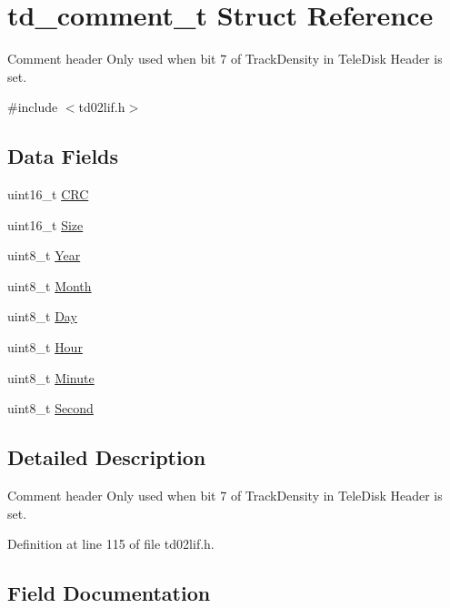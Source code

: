 \hypertarget{structtd__comment__t}{}\section{td\+\_\+comment\+\_\+t Struct Reference}
\label{structtd__comment__t}


Comment header Only used when bit 7 of Track\+Density in Tele\+Disk Header is set.  




{\ttfamily \#include $<$td02lif.\+h$>$}

\subsection*{Data Fields}
\begin{DoxyCompactItemize}
\item 
uint16\+\_\+t \hyperlink{structtd__comment__t_a4bcc6435d5a4408627be9f50ef124211}{C\+RC}
\item 
uint16\+\_\+t \hyperlink{structtd__comment__t_aca61f38ae62a6de2ff0eab7da2c25e11}{Size}
\item 
uint8\+\_\+t \hyperlink{structtd__comment__t_a0c804ec07303f411dd508dc64900aff5}{Year}
\item 
uint8\+\_\+t \hyperlink{structtd__comment__t_ac926fbfad0e3544bb45bb05b7cd66c49}{Month}
\item 
uint8\+\_\+t \hyperlink{structtd__comment__t_ab42475ed36aa4475f76336099fd53acc}{Day}
\item 
uint8\+\_\+t \hyperlink{structtd__comment__t_ae42f4895a24dadba8528e32d89d601c6}{Hour}
\item 
uint8\+\_\+t \hyperlink{structtd__comment__t_a40d01b0af51b4896e0d771e8a458ed87}{Minute}
\item 
uint8\+\_\+t \hyperlink{structtd__comment__t_ae89673be13e6cad1c83bd51034689248}{Second}
\end{DoxyCompactItemize}


\subsection{Detailed Description}
Comment header Only used when bit 7 of Track\+Density in Tele\+Disk Header is set. 

Definition at line 115 of file td02lif.\+h.



\subsection{Field Documentation}
